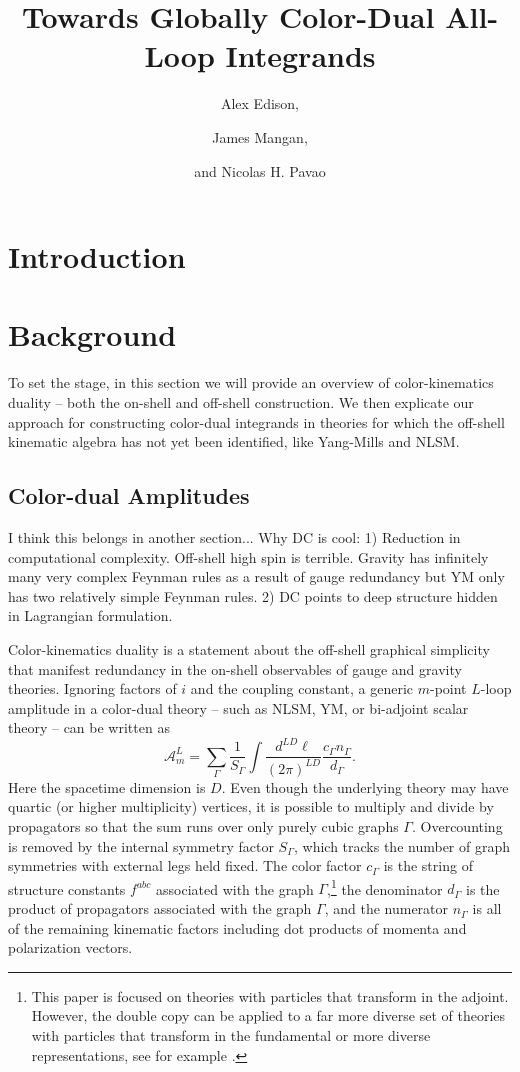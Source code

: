 \documentclass[11pt,letter]{article}
\author{\large Alex Edison,}
\author{\large James Mangan,}
\author{\large and Nicolas H. Pavao}
\affiliation{Department of Physics and Astronomy, Northwestern
  University, Evanston, Illinois 60208, USA}
\title{\center  \fontsize{18.8}{20} \selectfont  Towards Globally Color-Dual All-Loop Integrands}
\def\be{\begin{equation}}
\def\ee{\end{equation}}
\begin{document}
\maketitle
\flushbottom
 

\section{Introduction}
\section{Background}
To set the stage, in this section we will provide an overview of color-kinematics duality -- both the on-shell and off-shell construction. We then explicate our approach for constructing color-dual integrands in theories for which the off-shell kinematic algebra has not yet been identified, like Yang-Mills and NLSM. 
\subsection{Color-dual Amplitudes}

I think this belongs in another section...
Why DC is cool:
1) Reduction in computational complexity.
Off-shell high spin is terrible.
Gravity has infinitely many very complex Feynman rules as a result of gauge redundancy but YM only has two relatively simple Feynman rules.
2) DC points to deep structure hidden in Lagrangian formulation.

Color-kinematics duality is a statement about the off-shell graphical simplicity that manifest redundancy in the on-shell observables of gauge and gravity theories. Ignoring factors of $i$ and the coupling constant, a generic $m$-point $L$-loop amplitude in a color-dual theory -- such as NLSM, YM, or bi-adjoint scalar theory -- can be written as
\be
\mathcal{A}_m^L = \sum \limits_\Gamma \frac{1}{S_\Gamma} \int \frac{d^{LD}\ell}{(2\pi)^{LD}} \frac{c_\Gamma n_\Gamma}{d_\Gamma} .
\ee
Here the spacetime dimension is $D$.
Even though the underlying theory may have quartic (or higher multiplicity) vertices, it is possible to multiply and divide by propagators so that the sum runs over only purely cubic graphs $\Gamma$.
Overcounting is removed by the internal symmetry factor $S_\Gamma$, which tracks the number of graph symmetries with external legs held fixed.
The color factor $c_\Gamma$ is the string of structure constants $f^{abc}$ associated with the graph $\Gamma$,\footnote{This paper is focused on theories with particles that transform in the adjoint.  However, the double copy can be applied to a far more diverse set of theories with particles that transform in the fundamental or more diverse representations, see for example \cite{Johansson:2017srf, Johansson2014zca, Johansson:2015oia, Johansson:2019dnu, Carrasco:2023vjg, Carrasco:2020ywq}.}
the denominator $d_\Gamma$ is the product of propagators associated with the graph $\Gamma$, and the numerator $n_\Gamma$ is all of the remaining kinematic factors including dot products of momenta and polarization vectors.
\end{document}

